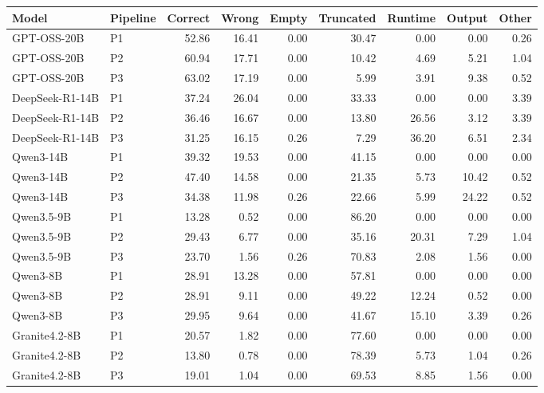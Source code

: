 \begin{tabular}{llrrrrrrr}
\toprule
Model & Pipeline & Correct & Wrong & Empty & Truncated & Runtime & Output & Other \\
\midrule
GPT-OSS-20B & P1 & 52.86 & 16.41 & 0.00 & 30.47 & 0.00 & 0.00 & 0.26 \\
GPT-OSS-20B & P2 & 60.94 & 17.71 & 0.00 & 10.42 & 4.69 & 5.21 & 1.04 \\
GPT-OSS-20B & P3 & 63.02 & 17.19 & 0.00 & 5.99 & 3.91 & 9.38 & 0.52 \\
DeepSeek-R1-14B & P1 & 37.24 & 26.04 & 0.00 & 33.33 & 0.00 & 0.00 & 3.39 \\
DeepSeek-R1-14B & P2 & 36.46 & 16.67 & 0.00 & 13.80 & 26.56 & 3.12 & 3.39 \\
DeepSeek-R1-14B & P3 & 31.25 & 16.15 & 0.26 & 7.29 & 36.20 & 6.51 & 2.34 \\
Qwen3-14B & P1 & 39.32 & 19.53 & 0.00 & 41.15 & 0.00 & 0.00 & 0.00 \\
Qwen3-14B & P2 & 47.40 & 14.58 & 0.00 & 21.35 & 5.73 & 10.42 & 0.52 \\
Qwen3-14B & P3 & 34.38 & 11.98 & 0.26 & 22.66 & 5.99 & 24.22 & 0.52 \\
Qwen3.5-9B & P1 & 13.28 & 0.52 & 0.00 & 86.20 & 0.00 & 0.00 & 0.00 \\
Qwen3.5-9B & P2 & 29.43 & 6.77 & 0.00 & 35.16 & 20.31 & 7.29 & 1.04 \\
Qwen3.5-9B & P3 & 23.70 & 1.56 & 0.26 & 70.83 & 2.08 & 1.56 & 0.00 \\
Qwen3-8B & P1 & 28.91 & 13.28 & 0.00 & 57.81 & 0.00 & 0.00 & 0.00 \\
Qwen3-8B & P2 & 28.91 & 9.11 & 0.00 & 49.22 & 12.24 & 0.52 & 0.00 \\
Qwen3-8B & P3 & 29.95 & 9.64 & 0.00 & 41.67 & 15.10 & 3.39 & 0.26 \\
Granite4.2-8B & P1 & 20.57 & 1.82 & 0.00 & 77.60 & 0.00 & 0.00 & 0.00 \\
Granite4.2-8B & P2 & 13.80 & 0.78 & 0.00 & 78.39 & 5.73 & 1.04 & 0.26 \\
Granite4.2-8B & P3 & 19.01 & 1.04 & 0.00 & 69.53 & 8.85 & 1.56 & 0.00 \\
\bottomrule
\end{tabular}
